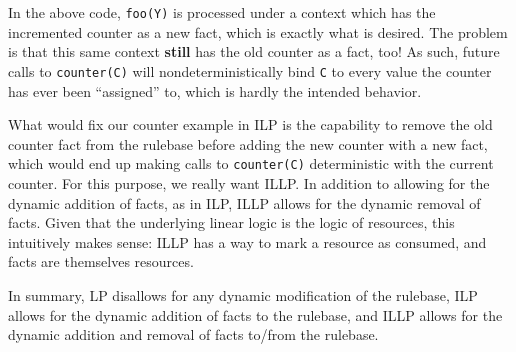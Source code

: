 In the above code, \texttt{foo(Y)} is processed under a context which has the incremented counter as a new fact, which is exactly what is desired.
The problem is that this same context \textbf{still} has the old counter as a fact, too!
As such, future calls to \texttt{counter(C)} will nondeterministically bind \texttt{C} to every value the counter has ever been ``assigned'' to, which is hardly the intended behavior.

What would fix our counter example in ILP is the capability to remove the old counter fact from the rulebase before adding the new counter with a new fact, which would end up making calls to \texttt{counter(C)} deterministic with the current counter.
For this purpose, we really want ILLP.
In addition to allowing for the dynamic addition of facts, as in ILP, ILLP allows for the dynamic removal of facts.
Given that the underlying linear logic is the logic of resources, this intuitively makes sense: ILLP has a way to mark a resource as consumed, and facts are themselves resources.

In summary, LP disallows for any dynamic modification of the rulebase, ILP allows for the dynamic addition of facts to the rulebase, and ILLP allows for the dynamic addition and removal of facts to/from the rulebase.

